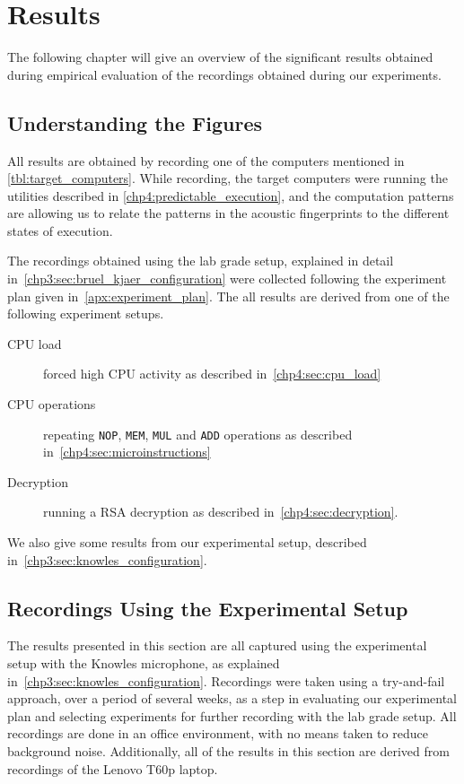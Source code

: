 \chapter{Results}
\label{chp5:results}
The following chapter will give an overview of the significant results obtained during empirical evaluation of the recordings obtained during our experiments.

\section{Understanding the Figures}
All results are obtained by recording one of the computers mentioned in \autoref{tbl:target_computers}.
While recording, the target computers were running the utilities described in \autoref{chp4:predictable_execution}, and the computation patterns are allowing us to relate the 
patterns in the acoustic fingerprints to the different states of execution.

The recordings obtained using the lab grade setup, explained in detail in~\autoref{chp3:sec:bruel_kjaer_configuration}  were collected following the experiment plan given in~\autoref{apx:experiment_plan}. 
The all results are derived from one of the following experiment setups.

\begin{description}
    \item[CPU load] forced high CPU activity as described in~\autoref{chp4:sec:cpu_load}
    \item[CPU operations] repeating \texttt{NOP}, \texttt{MEM}, \texttt{MUL} and \texttt{ADD} operations as described in~\autoref{chp4:sec:microinstructions}
    \item[Decryption] running a RSA decryption as described in~\autoref{chp4:sec:decryption}.
\end{description}

We also give some results from our experimental setup, described in~\autoref{chp3:sec:knowles_configuration}.

\section{Recordings Using the Experimental Setup}\label{chp5:sec:knowles_results}
The results presented in this section are all captured using the experimental setup with the Knowles microphone, as explained in~\autoref{chp3:sec:knowles_configuration}.
Recordings were taken using a try-and-fail approach, over a period of several weeks, as a step in evaluating our experimental plan and selecting experiments for further recording with the lab grade setup.
All recordings are done in an office environment, with no means taken to reduce background noise.
Additionally, all of the results in this section are derived from recordings of the Lenovo T60p laptop.

